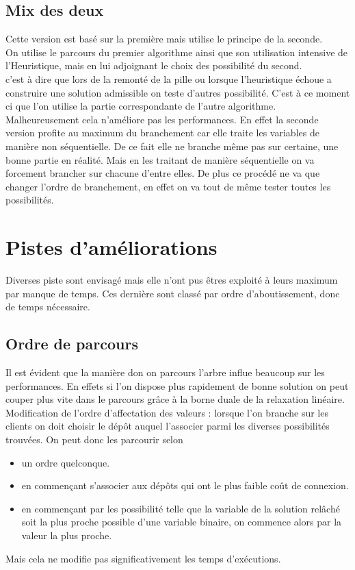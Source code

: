 \documentclass[12pt,a4paper]{article}
\begin{document}
\subsection{Mix des deux}

Cette version est basé sur la première mais utilise le principe de la seconde.\\

On utilise le parcours du premier algorithme ainsi que son utilisation intensive de l'Heuristique, mais en lui adjoignant le choix des possibilité du second.\\

c'est à dire que lors de la remonté de la pille ou lorsque l'heuristique échoue a construire une solution admissible on teste d'autres possibilité. C'est à ce moment ci que l'on utilise la partie correspondante de l'autre algorithme.\\

Malheureusement cela n'améliore pas les performances. En effet la seconde version profite au maximum du branchement car elle traite les variables de manière non séquentielle. De ce fait elle ne branche même pas sur certaine, une bonne partie en réalité. Mais en les traitant de manière séquentielle on va forcement brancher sur chacune d'entre elles. De plus ce procédé ne va que changer l'ordre de branchement, en effet on va tout de même tester toutes les possibilités.

\section{Pistes d'améliorations}

Diverses piste sont envisagé mais elle n'ont pus êtres exploité à leurs maximum par manque de temps. Ces dernière sont classé par ordre d'aboutissement, donc de temps nécessaire.

\subsection{Ordre de parcours}

Il est évident que la manière don on parcours l'arbre influe beaucoup sur les performances. En effets si l'on dispose plus rapidement de bonne solution on peut couper plus vite dans le parcours grâce à la borne duale de la relaxation linéaire.\\

Modification de l'ordre d'affectation des valeurs : lorsque l'on branche sur les clients on doit choisir le dépôt auquel l'associer parmi les diverses possibilités trouvées. On peut donc les parcourir selon
\begin{itemize}
\item
un ordre quelconque.
\item
en commençant s'associer aux dépôts qui ont le plus faible coût de connexion.
\item
en commençant par les possibilité telle que la variable de la solution relâché soit la plus proche possible d'une variable binaire, on commence alors par la valeur la plus proche.
\end{itemize}
Mais cela ne modifie pas significativement les temps d’exécutions.\\
\end{document}
